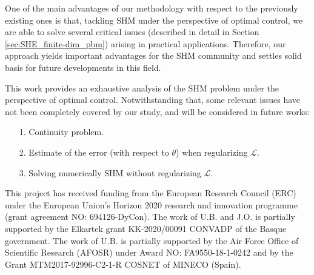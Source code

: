 \documentclass[twocolumn]{autart}    %
\begin{document}
One of the main advantages of our methodology with respect to the previously existing ones is that, tackling SHM under the perspective of optimal control, we are able to solve several critical issues (described in detail in Section \ref{sec:SHE_finite-dim_pbm}) arising in practical applications. Therefore, our approach yields important advantages for the SHM community and settles solid basis for future developments in this field.

This work provides an exhaustive analysis of the SHM problem under the perspective of optimal control. Notwithstanding that, some relevant issues have not been completely covered by our study, and will be considered in future works:
\begin{itemize}
	\item[1.] Continuity problem.
	\item[2.] Estimate of the error (with respect to $\theta$) when regularizing $\mathcal L$.
	\item[3.] Solving numerically SHM without regularizing $\mathcal L$.
\end{itemize}

\begin{ack}            
This project has received funding from the European Research Council (ERC) under the European Union’s Horizon 2020 research and innovation programme (grant agreement NO: 694126-DyCon). The work of U.B. and J.O. is partially supported by the Elkartek grant KK-2020/00091 CONVADP of the Basque government. The work of U.B. is partially supported by the Air Force Office of Scientific Research (AFOSR) under Award NO: FA9550-18-1-0242 and by the Grant MTM2017-92996-C2-1-R COSNET of MINECO (Spain).
\end{ack}
 


 
\end{document}
